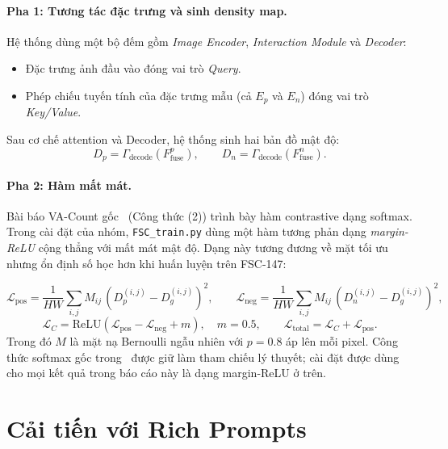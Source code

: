 \documentclass[a4paper,12pt]{report}
\numberwithin{figure}{chapter}
\numberwithin{table}{chapter}
\begin{document}
\paragraph{Pha 1: Tương tác đặc trưng và sinh density map.}
Hệ thống dùng một bộ đếm gồm \textit{Image Encoder}, \textit{Interaction Module} và \textit{Decoder}:
\begin{itemize}
    \item Đặc trưng ảnh đầu vào đóng vai trò \textit{Query}.
    \item Phép chiếu tuyến tính của đặc trưng mẫu (cả $E_p$ và $E_n$) đóng vai trò \textit{Key/Value}.
\end{itemize}
Sau cơ chế attention và Decoder, hệ thống sinh hai bản đồ mật độ:
\begin{equation}
D_p = \Gamma_{\text{decode}}(F^p_{\text{fuse}}), \qquad
D_n = \Gamma_{\text{decode}}(F^n_{\text{fuse}}).
\end{equation}

\paragraph{Pha 2: Hàm mất mát.}
Bài báo VA-Count gốc~\cite{vacount} (Công thức (2)) trình bày hàm contrastive dạng softmax. Trong cài đặt của nhóm, \texttt{FSC\_train.py} dùng một hàm tương phản dạng \emph{margin-ReLU} cộng thẳng với mất mát mật độ. Dạng này tương đương về mặt tối ưu nhưng ổn định số học hơn khi huấn luyện trên FSC-147:

\begin{equation}
\mathcal{L}_{\text{pos}} = \frac{1}{HW}\sum_{i,j} M_{ij}\,(D^{(i,j)}_p - D^{(i,j)}_g)^2,
\qquad
\mathcal{L}_{\text{neg}} = \frac{1}{HW}\sum_{i,j} M_{ij}\,(D^{(i,j)}_n - D^{(i,j)}_g)^2,
\end{equation}
\begin{equation}
\mathcal{L}_{C} = \mathrm{ReLU}\!\left(\mathcal{L}_{\text{pos}} - \mathcal{L}_{\text{neg}} + m\right),\quad m = 0.5,
\qquad
\mathcal{L}_{\text{total}} = \mathcal{L}_{C} + \mathcal{L}_{\text{pos}}.
\end{equation}
Trong đó $M$ là mặt nạ Bernoulli ngẫu nhiên với $p=0{.}8$ áp lên mỗi pixel. Công thức softmax gốc trong~\cite{vacount} được giữ làm tham chiếu lý thuyết; cài đặt được dùng cho mọi kết quả trong báo cáo này là dạng margin-ReLU ở trên.

\section{Cải tiến với Rich Prompts}
\label{sec:rich-prompts}
\end{document}
